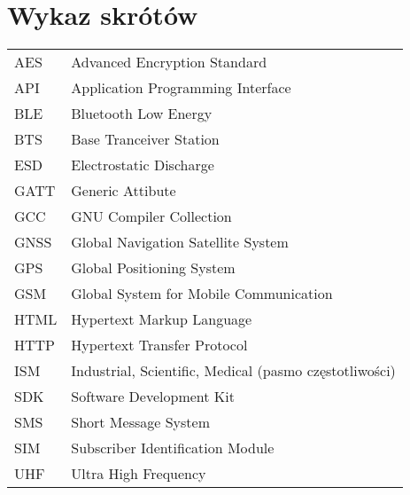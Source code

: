 \chapter*{Wykaz skrótów}

\begin{tabular}{l l}
AES & Advanced Encryption Standard \\
API & Application Programming Interface \\
BLE & Bluetooth Low Energy \\
BTS & Base Tranceiver Station \\
ESD & Electrostatic Discharge \\
GATT & Generic Attibute \\
GCC & GNU Compiler Collection \\
GNSS & Global Navigation Satellite System \\
GPS & Global Positioning System \\
GSM & Global System for Mobile Communication \\
HTML & Hypertext Markup Language \\
HTTP & Hypertext Transfer Protocol \\
ISM & Industrial, Scientific, Medical (pasmo częstotliwości) \\
SDK & Software Development Kit \\
SMS & Short Message System \\
SIM & Subscriber Identification Module \\
UHF & Ultra High Frequency \\




\end{tabular}
